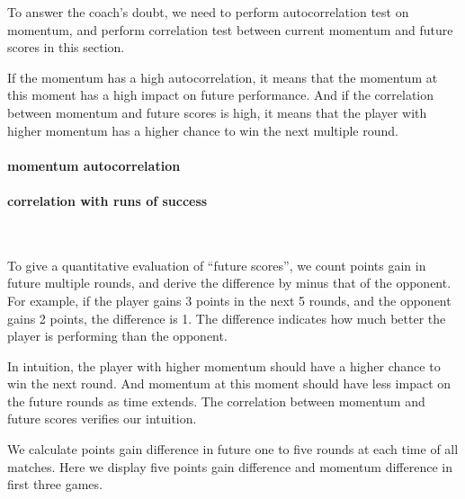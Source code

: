 To answer the coach's doubt,
we need to perform autocorrelation test on momentum, 
and perform correlation test between current momentum and future scores
in this section.

If the momentum has a high autocorrelation, it means that the momentum at this moment 
has a high impact on future performance. And if the correlation between momentum and 
future scores is high, it means that the player with higher momentum has a higher
chance to win the next multiple round.

\paragraph{momentum autocorrelation}

\paragraph{correlation with runs of success}~{}

To give a quantitative evaluation of ``future scores'', we count points gain in future multiple rounds,
and derive the difference by minus that of the opponent. 
For example, if the player gains 3 points in the next 5 rounds, and the opponent gains 2 points,
the difference is 1.
The difference indicates how much better the player is performing than the opponent.

In intuition, the player with higher momentum should have a higher chance to win the next round.
And momentum at this moment should have less impact on the future rounds as time extends.
The correlation between momentum and future scores verifies our intuition.

We calculate points gain difference in future one to five rounds at each time of all matches.
Here we display five points gain difference and momentum difference in first three games.

